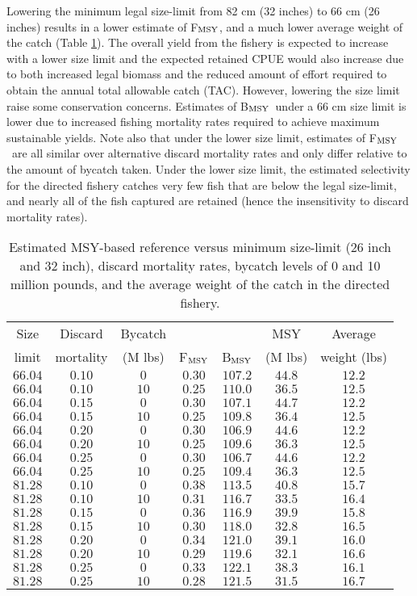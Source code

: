 \documentclass[12pt,leqno]{article}
\newcommand{\fmsy}{F$_{\textnormal{MSY}}$}
\newcommand{\bmsy}{B$_{\textnormal{MSY}}$}
\begin{document}
Lowering the minimum legal size-limit from 82 cm (32 inches) to 66 cm (26 inches) results in a lower estimate of \fmsy, and a much lower average weight of the catch (Table \ref{tab:MSY_reference_points}). The overall yield from the fishery is expected to increase with a lower size limit and the expected retained CPUE would also increase due to both increased legal biomass and the reduced amount of effort required to obtain the annual total allowable catch (TAC).  However, lowering the size limit raise some conservation concerns.  Estimates of \bmsy\ under a 66 cm size limit is lower due to increased fishing mortality rates required to achieve maximum sustainable yields.  Note also that under the lower size limit, estimates of \fmsy\ are all similar over alternative discard mortality rates and only differ relative to the amount of bycatch taken.  Under the lower size limit, the estimated selectivity for the directed fishery catches very few fish that are below the legal size-limit, and nearly all of the fish captured are retained (hence the insensitivity to discard mortality rates).

\begin{table}[!tbp]
\caption{Estimated MSY-based reference versus minimum size-limit (26 inch and 32 inch), discard mortality rates, bycatch levels of 0 and 10 million pounds, and the average weight of the catch in the directed fishery. }\label{tab:MSY_reference_points}
\begin{center}
\begin{tabular}{ccccccc}
\hline\hline
\multicolumn{1}{c}{Size}&
\multicolumn{1}{c}{Discard}&
\multicolumn{1}{c}{Bycatch}&
\multicolumn{1}{c}{}&
\multicolumn{1}{c}{}&
\multicolumn{1}{c}{MSY}&
\multicolumn{1}{c}{Average}
\tabularnewline
\multicolumn{1}{c}{limit}&
\multicolumn{1}{c}{mortality}&
\multicolumn{1}{c}{(M lbs)}&
\multicolumn{1}{c}{\fmsy}&
\multicolumn{1}{c}{\bmsy}&
\multicolumn{1}{c}{(M lbs)}&
\multicolumn{1}{c}{weight (lbs)}
\tabularnewline
\hline
$66.04$&$0.10$&$ 0$&$0.30$&$107.2$&$44.8$&$12.2$\tabularnewline
$66.04$&$0.10$&$10$&$0.25$&$110.0$&$36.5$&$12.5$\tabularnewline
$66.04$&$0.15$&$ 0$&$0.30$&$107.1$&$44.7$&$12.2$\tabularnewline
$66.04$&$0.15$&$10$&$0.25$&$109.8$&$36.4$&$12.5$\tabularnewline
$66.04$&$0.20$&$ 0$&$0.30$&$106.9$&$44.6$&$12.2$\tabularnewline
$66.04$&$0.20$&$10$&$0.25$&$109.6$&$36.3$&$12.5$\tabularnewline
$66.04$&$0.25$&$ 0$&$0.30$&$106.7$&$44.6$&$12.2$\tabularnewline
$66.04$&$0.25$&$10$&$0.25$&$109.4$&$36.3$&$12.5$\tabularnewline
\hline
$81.28$&$0.10$&$ 0$&$0.38$&$113.5$&$40.8$&$15.7$\tabularnewline
$81.28$&$0.10$&$10$&$0.31$&$116.7$&$33.5$&$16.4$\tabularnewline
$81.28$&$0.15$&$ 0$&$0.36$&$116.9$&$39.9$&$15.8$\tabularnewline
$81.28$&$0.15$&$10$&$0.30$&$118.0$&$32.8$&$16.5$\tabularnewline
$81.28$&$0.20$&$ 0$&$0.34$&$121.0$&$39.1$&$16.0$\tabularnewline
$81.28$&$0.20$&$10$&$0.29$&$119.6$&$32.1$&$16.6$\tabularnewline
$81.28$&$0.25$&$ 0$&$0.33$&$122.1$&$38.3$&$16.1$\tabularnewline
$81.28$&$0.25$&$10$&$0.28$&$121.5$&$31.5$&$16.7$\tabularnewline
\hline
\end{tabular}
\end{center}
\end{table}
\end{document}
